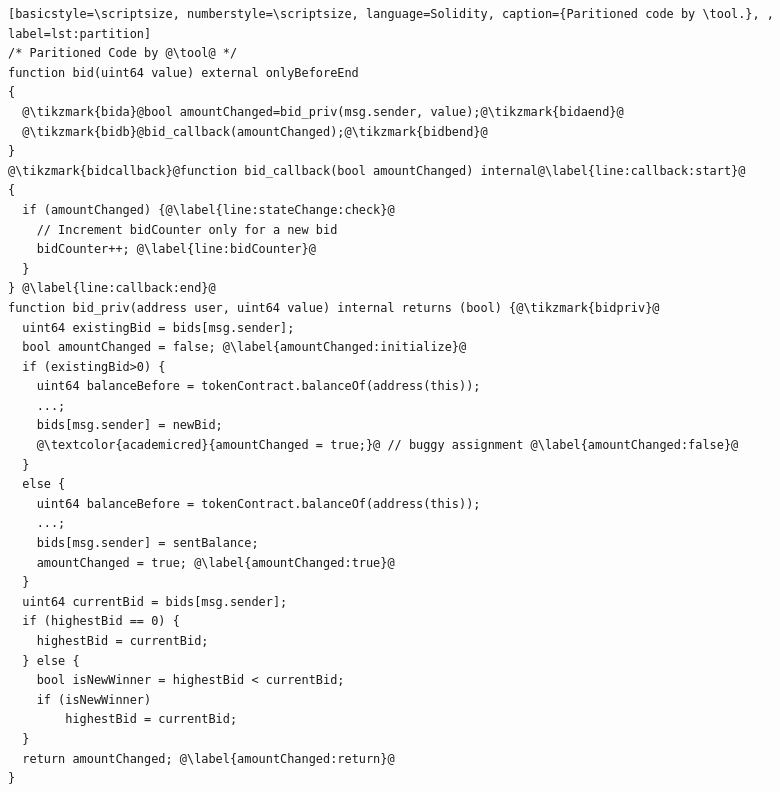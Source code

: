 \begin{figure*}[t]
\begin{multicols}{2}
\begin{lstlisting}[basicstyle=\scriptsize, numberstyle=\scriptsize, language=Solidity, caption={Paritioned code by \tool.}, , label=lst:partition]
/* Paritioned Code by @\tool@ */
function bid(uint64 value) external onlyBeforeEnd 
{
  @\tikzmark{bida}@bool amountChanged=bid_priv(msg.sender, value);@\tikzmark{bidaend}@
  @\tikzmark{bidb}@bid_callback(amountChanged);@\tikzmark{bidbend}@
} 
@\tikzmark{bidcallback}@function bid_callback(bool amountChanged) internal@\label{line:callback:start}@
{
  if (amountChanged) {@\label{line:stateChange:check}@  
    // Increment bidCounter only for a new bid
    bidCounter++; @\label{line:bidCounter}@
  }
} @\label{line:callback:end}@
function bid_priv(address user, uint64 value) internal returns (bool) {@\tikzmark{bidpriv}@
  uint64 existingBid = bids[msg.sender];
  bool amountChanged = false; @\label{amountChanged:initialize}@
  if (existingBid>0) {
    uint64 balanceBefore = tokenContract.balanceOf(address(this));
    ...;
    bids[msg.sender] = newBid;
    @\textcolor{academicred}{amountChanged = true;}@ // buggy assignment @\label{amountChanged:false}@
  } 
  else {
    uint64 balanceBefore = tokenContract.balanceOf(address(this));
    ...;
    bids[msg.sender] = sentBalance;
    amountChanged = true; @\label{amountChanged:true}@
  }
  uint64 currentBid = bids[msg.sender];
  if (highestBid == 0) {
    highestBid = currentBid;
  } else {
    bool isNewWinner = highestBid < currentBid;
    if (isNewWinner)
        highestBid = currentBid;
  }
  return amountChanged; @\label{amountChanged:return}@
}  
\end{lstlisting}

\end{multicols}
\end{figure*}


